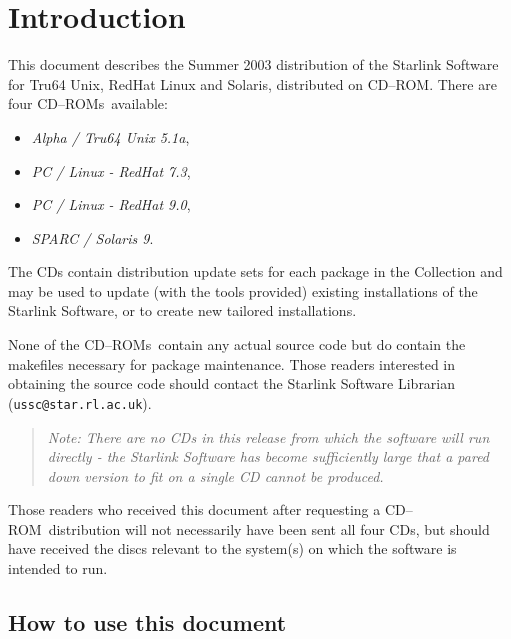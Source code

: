 \documentclass[twoside,11pt]{article}
\newcommand{\htmladdnormallink}[2]{#1}
\newcommand{\xlabel}[1]{}
\renewcommand{\_}{\texttt{\symbol{95}}}
\newcommand{\cdrom}{CD--ROM}
\newcommand{\cdrom}{CD-ROM}
\newcommand{\cdroms}{CD--ROMs}
\newcommand{\cdroms}{CD-ROMs}
\newcommand{\axp}{\textit{Alpha / Tru64 Unix 5.1a}}
\newcommand{\rha}{\textit{PC / Linux - RedHat 7.3}}
\newcommand{\rhb}{\textit{PC / Linux - RedHat 9.0}}
\newcommand{\sol}{\textit{SPARC / Solaris 9}}
\begin{document}
\section{\label{introduction}\xlabel{introduction}Introduction}

This document describes the Summer 2003 distribution of the Starlink
Software for Tru64 Unix, RedHat Linux and Solaris, distributed on
\cdrom.  There are four \cdroms\ available:

\begin{itemize}
\item \axp,
\item \rha,
\item \rhb,
\item \sol.
\end{itemize}

The CDs contain distribution update sets for each package in the
Collection and may be used to update (with the tools provided) existing
installations of the Starlink Software, or to create new tailored
installations.

None of the \cdroms\ contain any actual source code but do contain the
makefiles necessary for package maintenance.  Those readers interested in
obtaining the source code should contact the Starlink Software Librarian
(\htmladdnormallink{\texttt{ussc@star.rl.ac.uk}}{mailto:ussc@star.rl.ac.uk}).

\begin{quote}
\textit{Note: There are no CDs in this release from which the
software will run directly - the Starlink Software has become sufficiently
large that a pared down version to fit on a single CD cannot be produced.}
\end{quote}


Those readers who received this document after requesting a \cdrom\ 
distribution will not necessarily have been sent all four CDs, but
should have received the discs relevant to the system(s) on which the
software is intended to run.  


\subsection{\xlabel{how_to_use_this_document}How to use this document}
\label{how_to_use_this_document}
\end{document}
